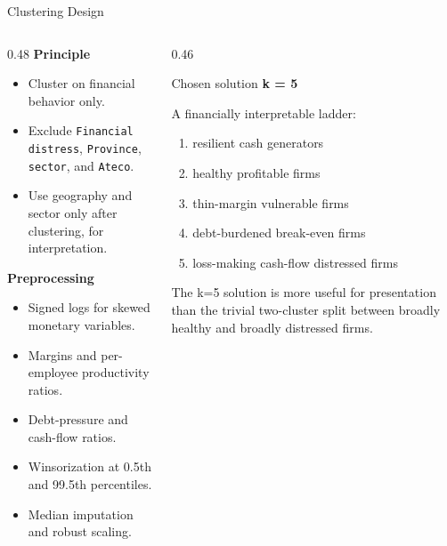\documentclass[aspectratio=169,10pt]{beamer}
\begin{document}
\begin{frame}{Clustering Design}
  \begin{columns}[T,totalwidth=\textwidth]
    \begin{column}{0.48\textwidth}
      \textbf{Principle}
      \begin{itemize}
        \item Cluster on financial behavior only.
        \item Exclude \texttt{Financial distress}, \texttt{Province}, \texttt{sector}, and \texttt{Ateco}.
        \item Use geography and sector only after clustering, for interpretation.
      \end{itemize}

      \vspace{0.15cm}
      \textbf{Preprocessing}
      \begin{itemize}
        \item Signed logs for skewed monetary variables.
        \item Margins and per-employee productivity ratios.
        \item Debt-pressure and cash-flow ratios.
        \item Winsorization at 0.5th and 99.5th percentiles.
        \item Median imputation and robust scaling.
      \end{itemize}
    \end{column}

    \begin{column}{0.46\textwidth}
      \begin{block}{Chosen solution}
        \centering
        \Large \textbf{k = 5}

        \vspace{0.2cm}
        \normalsize
        A financially interpretable ladder:
        \begin{enumerate}
          \item resilient cash generators
          \item healthy profitable firms
          \item thin-margin vulnerable firms
          \item debt-burdened break-even firms
          \item loss-making cash-flow distressed firms
        \end{enumerate}
      \end{block}

      \vspace{0.1cm}
      \small
      The k=5 solution is more useful for presentation than the trivial
      two-cluster split between broadly healthy and broadly distressed firms.
    \end{column}
  \end{columns}
\end{frame}
\end{document}
